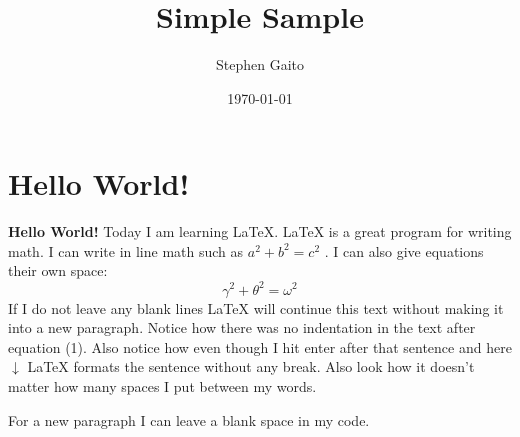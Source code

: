 \documentclass{article}
\title{Simple Sample}
\author{Stephen Gaito}
\date{\today}
\begin{document}
    \maketitle

    \section{Hello World!}

    \textbf{Hello World!} Today I am learning \LaTeX. %
     \LaTeX{} is a great program for writing math. I can write in line math such as $a^2+b^2=c^2$ %
     . I can also give equations their own space:
    \begin{equation}
    \gamma^2+\theta^2=\omega^2
    \end{equation}
    If I do not leave any blank lines \LaTeX{} will continue  this text without making it into a new paragraph.  Notice how there was no indentation in the text after equation (1).
    Also notice how even though I hit enter after that sentence and here $\downarrow$
     \LaTeX{} formats the sentence without any break.  Also   look  how      it   doesn't     matter          how    many  spaces     I put     between       my    words.

    For a new paragraph I can leave a blank space in my code.
\end{document}
